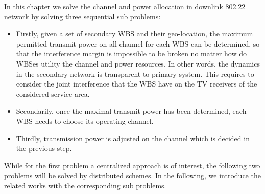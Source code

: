 In this chapter we solve the channel and power allocation in downlink 802.22 network by solving three sequential sub problems:
\begin{itemize}
\item  Firstly, given a set of secondary WBS and their geo-location, the maximum permitted transmit power on all channel for each WBS can be determined, so that the interference margin is impossible to be broken no matter how do WBSes utility the channel and power resources. 
In other words, the dynamics in the secondary network is transparent to primary system. 
This requires to consider the joint interference that the WBS have on the TV receivers of the considered service area. 
\item Secondarily, once the maximal transmit power has been determined, each WBS needs to choose its operating channel. 
\item Thirdly, transmission power is adjusted on the channel which is decided in the previous step.
\end{itemize}
While for the first problem a centralized approach is of interest, the following two problems will be solved by distributed schemes.
In the following, we introduce the related works with the corresponding sub problems.





